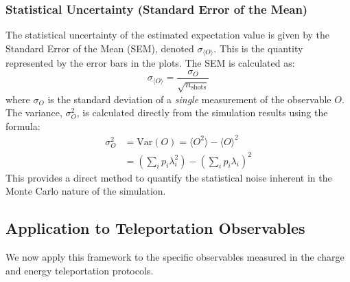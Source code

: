 \subsubsection{Statistical Uncertainty (Standard Error of the Mean)}
The statistical uncertainty of the estimated expectation value is given by the Standard Error of the Mean (SEM), denoted $\sigma_{\langle O \rangle}$. This is the quantity represented by the error bars in the plots. The SEM is calculated as:
\begin{equation}
    \sigma_{\langle O \rangle} = \frac{\sigma_O}{\sqrt{n_{\text{shots}}}}
\end{equation}
where $\sigma_O$ is the standard deviation of a \textit{single} measurement of the observable $O$. The variance, $\sigma_O^2$, is calculated directly from the simulation results using the formula:
\begin{equation}
    \begin{aligned}
        \sigma_O^2 &= \text{Var}(O) = \langle O^2 \rangle - \langle O \rangle^2 \\
        &= \left( \sum_{i} p_i \lambda_i^2 \right) - \left( \sum_{i} p_i \lambda_i \right)^2
    \end{aligned}
\end{equation}
This provides a direct method to quantify the statistical noise inherent in the Monte Carlo nature of the simulation.

\subsection{Application to Teleportation Observables}

We now apply this framework to the specific observables measured in the charge and energy teleportation protocols.

